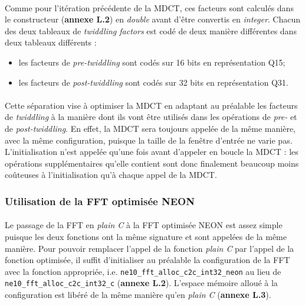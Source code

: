 \documentclass{article}
\begin{document}
    \paragraph{}
    Comme pour l'itération précédente de la MDCT, ces facteurs sont calculés dans le constructeur (\textbf{annexe L.2}) en \emph{double} avant d'être convertis en \emph{integer}. Chacun des deux tableaux de \emph{twiddling factors} est codé de deux manière différentes dans deux tableaux différents :
    \begin{itemize}
        \item les facteurs de \emph{pre-twiddling} sont codés sur 16 bits en représentation Q15;
        \item les facteurs de \emph{post-twiddling} sont codés sur 32 bits en représentation Q31.
    \end{itemize}

    \paragraph{}
    Cette séparation vise à optimiser la MDCT en adaptant au préalable les facteurs de \emph{twiddling} à la manière dont ils vont être utilisés dans les opérations de \emph{pre-} et de \emph{post-twiddling}. En effet, la MDCT sera toujours appelée de la même manière, avec la même configuration, puisque la taille de la fenêtre d'entrée ne varie pas. L'initialisation n'est appelée qu'une fois avant d'appeler en boucle la MDCT : les opérations supplémentaires qu'elle contient sont donc finalement beaucoup moins coûteuses à l'initialisation qu'à chaque appel de la MDCT.


    \subsubsection{Utilisation de la FFT optimisée NEON}
    \paragraph{}
    Le passage de la FFT en \emph{plain C} à la FFT optimisée NEON est assez simple puisque les deux fonctions ont la même signature et sont appelées de la même manière. Pour pouvoir remplacer l'appel de la fonction \emph{plain C} par l'appel de la fonction optimisée, il suffit d'initialiser au préalable la configuration de la FFT avec la fonction appropriée, i.e. \texttt{ne10\_fft\_alloc\_c2c\_int32\_neon} au lieu de \texttt{ne10\_fft\_alloc\_c2c\_int32\_c} (\textbf{annexe L.2}). L'espace mémoire alloué à la configuration est libéré de la même manière qu'en \emph{plain C} (\textbf{annexe L.3}).
\end{document}
